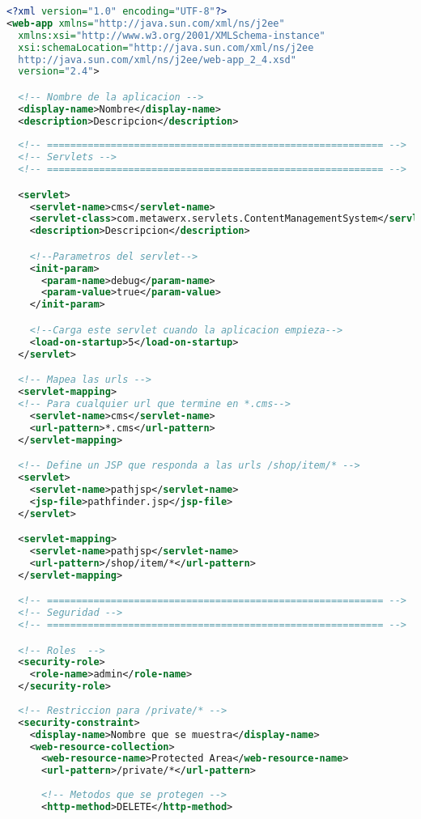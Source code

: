 \documentclass[12pt, titlepage]{article}
\begin{document}
\begin{lstlisting}[language=XML, style=customXML]
<?xml version="1.0" encoding="UTF-8"?>
<web-app xmlns="http://java.sun.com/xml/ns/j2ee"
  xmlns:xsi="http://www.w3.org/2001/XMLSchema-instance"
  xsi:schemaLocation="http://java.sun.com/xml/ns/j2ee 
  http://java.sun.com/xml/ns/j2ee/web-app_2_4.xsd"
  version="2.4">

  <!-- Nombre de la aplicacion -->
  <display-name>Nombre</display-name>
  <description>Descripcion</description>
  
  <!-- ========================================================== -->
  <!-- Servlets -->
  <!-- ========================================================== -->

  <servlet>
    <servlet-name>cms</servlet-name>
    <servlet-class>com.metawerx.servlets.ContentManagementSystem</servlet-class>
    <description>Descripcion</description>

    <!--Parametros del servlet-->
    <init-param>
      <param-name>debug</param-name>
      <param-value>true</param-value>
    </init-param>

    <!--Carga este servlet cuando la aplicacion empieza-->
    <load-on-startup>5</load-on-startup>
  </servlet>

  <!-- Mapea las urls -->
  <servlet-mapping>
  <!-- Para cualquier url que termine en *.cms-->
    <servlet-name>cms</servlet-name>
    <url-pattern>*.cms</url-pattern>
  </servlet-mapping>

  <!-- Define un JSP que responda a las urls /shop/item/* -->
  <servlet>
    <servlet-name>pathjsp</servlet-name>
    <jsp-file>pathfinder.jsp</jsp-file>
  </servlet>

  <servlet-mapping>
    <servlet-name>pathjsp</servlet-name>
    <url-pattern>/shop/item/*</url-pattern>
  </servlet-mapping>

  <!-- ========================================================== -->
  <!-- Seguridad -->
  <!-- ========================================================== -->

  <!-- Roles  -->
  <security-role>
    <role-name>admin</role-name>
  </security-role>
  
  <!-- Restriccion para /private/* -->
  <security-constraint>
    <display-name>Nombre que se muestra</display-name>
    <web-resource-collection>
      <web-resource-name>Protected Area</web-resource-name>
      <url-pattern>/private/*</url-pattern>
                        
      <!-- Metodos que se protegen -->
      <http-method>DELETE</http-method>


\end{lstlisting}
\end{document}
